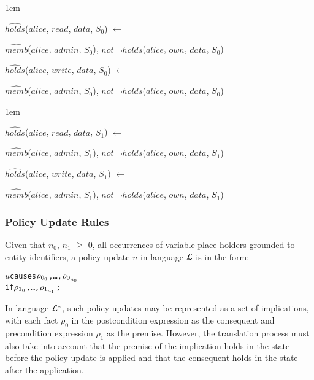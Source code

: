 \documentclass[11pt]{report}
\newenvironment{vverbatim}
{
  \begin{alltt}
}
{
    \vspace{-\baselineskip}
  \end{alltt}
}
\newenvironment{vquote}
{
  \begin{list}{}{\leftmargin 1em}\item[]
}
{
  \end{list}
}
\begin{document}
          \begin{vquote}
            $\hat{holds}$($alice$, $read$, $data$, $S_{0}$) $\leftarrow$

            \hspace{1em}
            $\hat{memb}$($alice$, $admin$, $S_{0}$),
            $not$ $\lnot\hat{holds}$($alice$, $own$, $data$, $S_{0}$)

            $\hat{holds}$($alice$, $write$, $data$, $S_{0}$) $\leftarrow$

            \hspace{1em}
            $\hat{memb}$($alice$, $admin$, $S_{0}$),
            $not$ $\lnot\hat{holds}$($alice$, $own$, $data$, $S_{0}$)
          \end{vquote}

          \begin{vquote}
            $\hat{holds}$($alice$, $read$, $data$, $S_{1}$) $\leftarrow$

            \hspace{1em}
            $\hat{memb}$($alice$, $admin$, $S_{1}$),
            $not$ $\lnot\hat{holds}$($alice$, $own$, $data$, $S_{1}$)

            $\hat{holds}$($alice$, $write$, $data$, $S_{1}$) $\leftarrow$

            \hspace{1em}
            $\hat{memb}$($alice$, $admin$, $S_{1}$),
            $not$ $\lnot\hat{holds}$($alice$, $own$, $data$, $S_{1}$)
          \end{vquote}

        \subsubsection{Policy Update Rules}

          Given that $n_0$, $n_1$ $\geq$ $0$, all occurrences of variable
          place-holders grounded to entity identifiers, a policy update $u$
          in language ${\cal L}$ is in the form:

          \begin{vverbatim}
  \(u\) causes \(\rho\sb{0\sb{0}}\), \ldots, \(\rho\sb{0\sb{n\sb{0}}}\)
  if \(\rho\sb{1\sb{0}}\), \ldots, \(\rho\sb{1\sb{n\sb{1}}}\);
          \end{vverbatim}

          In language ${\cal L}^{*}$, such policy updates may be represented
          as a set of implications, with each fact $\rho_{0}$ in the
          postcondition expression as the consequent and precondition
          expression $\rho_{1}$ as the premise. However, the translation
          process must also take into account that the premise of the
          implication holds in the state before the policy update is applied
          and that the consequent holds in the state after the application.
\end{document}
